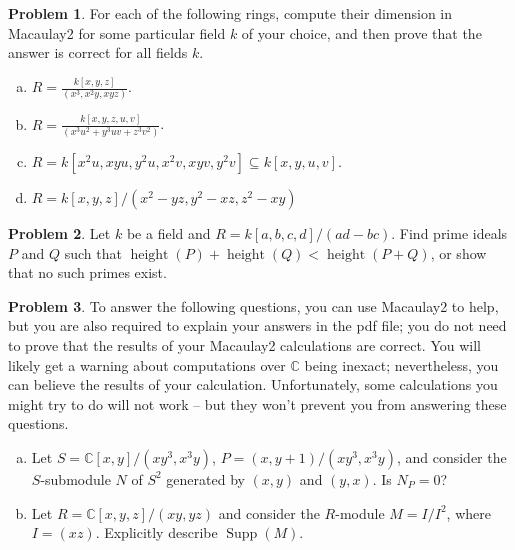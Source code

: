 \documentclass[11pt]{article}
\DeclareMathOperator{\Supp}{Supp}
\DeclareMathOperator{\height}{height}
\theoremstyle{definition}
\newtheorem{problem}{Problem}
\begin{document}
\vfill


\begin{problem}
	For each of the following rings, compute their dimension in Macaulay2 for some particular field $k$ of your choice, and then prove that the answer is correct for all fields $k$.

\begin{enumerate}[a)]
\item $\displaystyle R=\frac{k[x,y,z]}{(x^3,x^2y,xyz)}$.
\smallskip
\item $\displaystyle R=\frac{k[x,y,z,u,v]}{(x^3 u^2 + y^3 uv + z^3 v^2)}$.
\smallskip
\item $\displaystyle R=k[x^2 u, xyu, y^2 u, x^2 v, xyv, y^2v] \subseteq k[x,y,u,v]$.
\smallskip
\item $R= k [x,y,z]/(x^2-yz, y^2-xz, z^2-xy)$
\end{enumerate}

\end{problem}


\vfill

\begin{problem}
	Let $k$ be a field and $R = k[a,b,c,d]/(ad-bc)$. Find prime ideals $P$ and $Q$ such that $\height(P) + \height(Q) < \height(P+Q)$, or show that no such primes exist.
\end{problem}

\newpage


\begin{problem}
	To answer the following questions, you can use Macaulay2 to help, but you are also required to explain your answers in the pdf file; you do not need to prove that the results of your Macaulay2 calculations are correct. You will likely get a warning about computations over $\mathbb{C}$ being inexact; nevertheless, you can believe the results of your calculation. Unfortunately, some calculations you might try to do will not work -- but they won't prevent you from answering these questions.
	\begin{enumerate}[a)]
		\item Let $S = \mathbb{C}[x,y]/(xy^3,x^3y)$, $P = (x,y+1)/(xy^3,x^3y)$, and consider the $S$-submodule $N$ of $S^2$ generated by $(x,y)$ and $(y,x)$. Is $N_P = 0$?
		\item Let $R = \mathbb{C}[x,y,z]/(xy,yz)$ and consider the $R$-module $M = I/I^2$, where $I = (xz)$. Explicitly describe $\Supp(M)$.
	\end{enumerate}
\end{problem}
\end{document}
